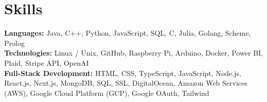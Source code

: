 \documentclass[11pt]{article}       %
\begin{document}

\vspace{-15.5pt}

\section*{Skills}
\textbf{Languages:} Java,  C++, Python, JavaScript, SQL, C, Julia, Golang, Scheme, Prolog \\
\textbf{Technologies:} Linux / Unix, GitHub, Raspberry Pi, Arduino, Docker, Power BI, Plaid, Stripe API, OpenAI\\
\textbf{Full-Stack Development:} HTML, CSS, TypeScript, JavaScript, Node.js, React.js, Next.js, MongoDB, SQL, SSL, DigitalOcean, Amazon Web Services (AWS), Google Cloud Platform (GCP), Google OAuth, Tailwind \\


\vspace{-6.5pt}
\end{document}
